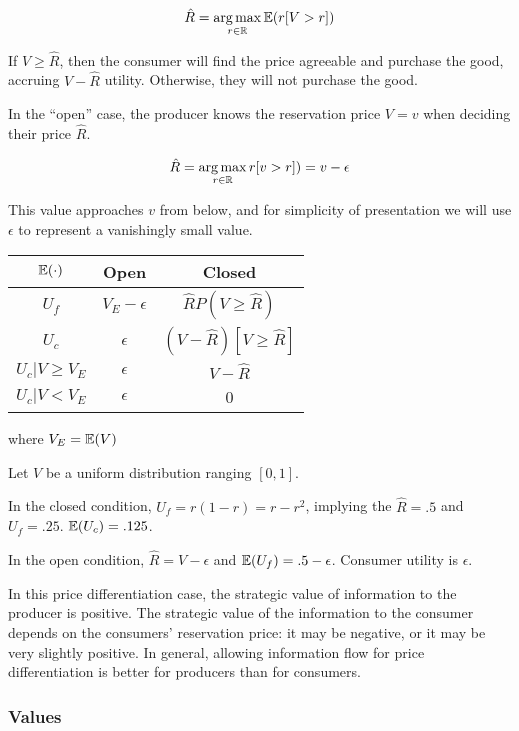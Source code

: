 \documentclass[../thesis.tex]{subfiles}
\begin{document}
$$\hat{R} = \operatorname*{arg\,max}_{r \in \mathbb{R}} \mathbb{E}(r [V > r])$$

If $V \geq \hat{R}$, then the consumer will find the
price agreeable and purchase the good, accruing $V - \hat{R}$
utility.
Otherwise, they will not purchase the good.

In the ``open'' case, the producer knows the reservation price
$V = v$ when deciding their price $\hat{R}$.

$$\hat{R} = \operatorname*{arg\,max}_{r \in \mathbb{R}} r [v > r]) = v - \epsilon$$

This value approaches $v$ from below, and for simplicity of
presentation we will use $\epsilon$ to represent a vanishingly
small value.

\begin{center}
\begin{tabular}{ |c|c|c| } 
 \hline
  $\mathbb{E}(\cdot)$ & Open & Closed  \\
 \hline
 $U_f$ & $V_E - \epsilon$ & $\hat{R} P(V \geq \hat{R})$ \\ 
 $U_c$ & $\epsilon$ & $(V - \hat{R}) [V \geq \hat{R}]$  \\
 $U_c \vert V \geq V_E$ & $\epsilon$ & $V - \hat{R}$  \\
 $U_c \vert V < V_E$ & $\epsilon$ & 0  \\
 \hline
\end{tabular}
\end{center}

where $V_E = \mathbb{E}(V)$

\begin{exm}
  Let $V$ be a uniform distribution ranging $[0,1]$.
  
  In the closed condition, $U_f = r (1 - r) = r - r^2$,
  implying the $\hat{R} = .5$ and $U_f = .25$.
  $\mathbb{E}(U_c) = .125$.

  In the open condition, $\hat{R} = V - \epsilon$
  and $\mathbb{E}(U_f) = .5 - \epsilon$.
  Consumer utility is $\epsilon$.
\end{exm}

In this price differentiation case, the strategic
value of information to the producer is positive.
The strategic value of the information to the consumer
depends on the consumers' reservation price: it may
be negative, or it may be very slightly positive.
In general, allowing information flow for price
differentiation is better for producers than for
consumers.

\subsubsection{Values}
\end{document}
